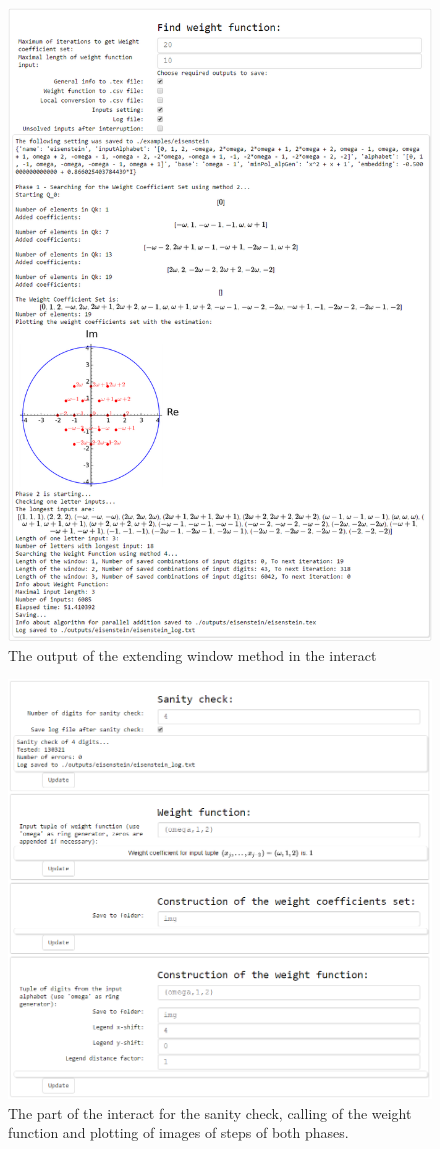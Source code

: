 \begin{figure}[htbp]
  \centering
  \includegraphics[width=\textwidth]{img/interact2.png}
  \caption{The output of the extending window method in the interact}
  \label{fig:interact2}
\end{figure}

\begin{figure}[htbp]
  \centering
  \includegraphics[width=\textwidth]{img/interact3.png}
  \caption{The part of the interact for the sanity check, calling of the weight function and plotting of images of steps of both phases.}
  \label{fig:interact3}
\end{figure}